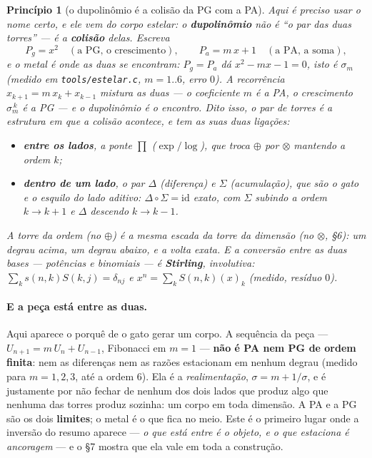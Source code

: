 \documentclass[11pt]{article}
\newcommand{\code}[1]{\texttt{\small #1}}
\theoremstyle{plain}
\newtheorem{principio}{Princípio}
\theoremstyle{remark}
\begin{document}
\begin{principio}[o dupolinômio é a colisão da PG com a PA]
Aqui é preciso usar o nome certo, e ele vem do corpo estelar: o \textbf{dupolinômio} não é ``o par das
duas torres'' --- é a \textbf{colisão} delas. Escreva
\[
 P_g = x^2 \quad(\text{a PG, o crescimento}),\qquad P_a = m\,x+1 \quad(\text{a PA, a soma}),
\]
e o metal é onde as duas se encontram: $P_g=P_a$ dá $x^2-mx-1=0$, isto é $\sigma_m$ (medido em
\code{tools/estelar.c}, $m=1..6$, erro $0$). A recorrência $x_{k+1}=m\,x_k+x_{k-1}$ mistura as duas ---
o coeficiente $m$ é a PA, o crescimento $\sigma_m^{\,k}$ é a PG --- e o dupolinômio é o \emph{encontro}.
Dito isso, o par de torres é a estrutura em que a colisão acontece, e tem as suas duas ligações:
\begin{itemize}\itemsep2pt
\item \textbf{entre os lados}, a ponte $\prod$ ($\exp/\log$), que troca $\oplus$ por $\otimes$
 mantendo a ordem $k$;
\item \textbf{dentro de um lado}, o par $\Delta$ (diferença) e $\Sigma$ (acumulação), que são o gato e
 o esquilo do lado aditivo: $\Delta\circ\Sigma=\mathrm{id}$ exato, com $\Sigma$ subindo a ordem
 $k\to k+1$ e $\Delta$ descendo $k\to k-1$.
\end{itemize}
A torre da \emph{ordem} (no $\oplus$) é a mesma escada da torre da \emph{dimensão} (no $\otimes$, §6):
um degrau acima, um degrau abaixo, e a volta exata. E a conversão entre as duas bases --- potências e
binomiais --- é \textbf{Stirling}, involutiva: $\sum_k s(n,k)S(k,j)=\delta_{nj}$ e
$x^n=\sum_k S(n,k)(x)_k$ (medido, resíduo $0$).
\end{principio}

\paragraph{E a peça está entre as duas.} Aqui aparece o porquê de o gato gerar um corpo. A sequência
da peça --- $U_{n+1}=m\,U_n+U_{n-1}$, Fibonacci em $m=1$ --- \textbf{não é PA nem PG de ordem
finita}: nem as diferenças nem as razões estacionam em nenhum degrau (medido para $m=1,2,3$, até a
ordem $6$). Ela é a \emph{realimentação}, $\sigma=m+1/\sigma$, e é justamente por não fechar de
nenhum dos dois lados que produz algo que nenhuma das torres produz sozinha: um corpo em toda
dimensão. A PA e a PG são os dois \textbf{limites}; o metal é o que fica no meio. Este é o primeiro
lugar onde a inversão do resumo aparece --- \emph{o que está entre é o objeto, e o que estaciona é
ancoragem} --- e o §7 mostra que ela vale em toda a construção.
\end{document}
